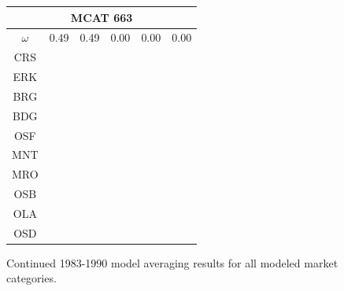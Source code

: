 \documentclass[12pt]{article}
\begin{document}
\begin{landscape}
\begin{figure}
\begin{minipage}[c]{0.3\textwidth}
\begin{tabular}{|c|c|c|c|c|c|}
         \hline \multicolumn{6}{|c|}{MCAT 663} \\ \hline
         $\omega$&0.49&0.49&0.00&0.00&0.00 \\ \hline
        CRS&\cellcolor[HTML]{E41A1C}&\cellcolor[HTML]{E41A1C}&\cellcolor[HTML]{E41A1C}&\cellcolor[HTML]{E41A1C}&\cellcolor[HTML]{E41A1C} \\ \hline
        ERK&\cellcolor[HTML]{E41A1C}&\cellcolor[HTML]{377EB8}&\cellcolor[HTML]{E41A1C}&\cellcolor[HTML]{E41A1C}&\cellcolor[HTML]{E41A1C} \\ \hline
        BRG&\cellcolor[HTML]{377EB8}&\cellcolor[HTML]{377EB8}&\cellcolor[HTML]{E41A1C}&\cellcolor[HTML]{377EB8}&\cellcolor[HTML]{377EB8} \\ \hline
        BDG&\cellcolor[HTML]{4DAF4A}&\cellcolor[HTML]{4DAF4A}&\cellcolor[HTML]{377EB8}&\cellcolor[HTML]{377EB8}&\cellcolor[HTML]{4DAF4A} \\ \hline
        OSF&\cellcolor[HTML]{984EA3}&\cellcolor[HTML]{984EA3}&\cellcolor[HTML]{377EB8}&\cellcolor[HTML]{377EB8}&\cellcolor[HTML]{984EA3} \\ \hline
        MNT&\cellcolor[HTML]{984EA3}&\cellcolor[HTML]{984EA3}&\cellcolor[HTML]{4DAF4A}&\cellcolor[HTML]{4DAF4A}&\cellcolor[HTML]{984EA3} \\ \hline
        MRO&\cellcolor[HTML]{FF7F00}&\cellcolor[HTML]{FF7F00}&\cellcolor[HTML]{4DAF4A}&\cellcolor[HTML]{4DAF4A}&\cellcolor[HTML]{984EA3} \\ \hline
        OSB&\cellcolor[HTML]{FFFF33}&\cellcolor[HTML]{FFFF33}&\cellcolor[HTML]{984EA3}&\cellcolor[HTML]{4DAF4A}&\cellcolor[HTML]{FF7F00} \\ \hline
        OLA&\cellcolor[HTML]{A65628}&\cellcolor[HTML]{A65628}&\cellcolor[HTML]{984EA3}&\cellcolor[HTML]{984EA3}&\cellcolor[HTML]{FF7F00} \\ \hline
        OSD&\cellcolor[HTML]{F781BF}&\cellcolor[HTML]{F781BF}&\cellcolor[HTML]{FF7F00}&\cellcolor[HTML]{FF7F00}&\cellcolor[HTML]{FFFF33} \\ \hline
\end{tabular}
\end{minipage}
\caption{Continued 1983-1990 model averaging results for all modeled market categories.}
\label{colorTabApp832}
\end{figure}
\end{landscape}

%
\clearpage
\singlespacing
%
\end{document}
